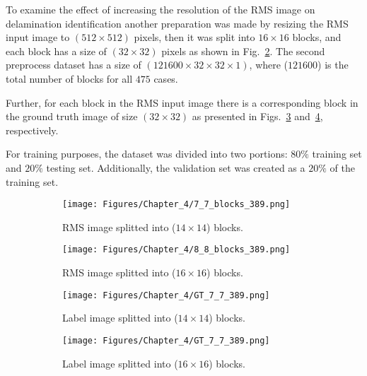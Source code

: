 To examine the effect of increasing the resolution of the RMS image on delamination identification another  preparation was made by resizing the RMS input image to \((512\times 512)\) pixels, then it was split into \(16\times 16\) blocks, and each block has a size of \((32\times 32)\) pixels as shown in Fig.~\ref{fig:RMS_64blocks}.
The second preprocess dataset has a size of \((121600 \times 32 \times 32 \times 1)\), where (\(121600\)) is the total number of blocks for all \(475\) cases.

Further, for each block in the RMS input image there is a corresponding block in the ground truth image of size \((32\times 32)\) as presented in Figs.~\ref{fig:GT_49blocks} and~\ref{fig:GT_64blocks}, respectively.

For training purposes, the dataset was divided into two portions: \(80\%\)	training set and \(20\%\) testing set. 
Additionally, the validation set was created as a \(20\%\) of the training set.
\begin{figure} [h!]
	\centering
	\begin{subfigure}[b]{0.47\textwidth}
		\centering
		\texttt{[image: Figures/Chapter\_4/7\_7\_blocks\_389.png]}
		\caption{RMS image splitted into (\(14\times 14\)) blocks.}
		\label{fig:RMS_49blocks}
	\end{subfigure}
	\hfill
	\begin{subfigure}[b]{0.47\textwidth}
		\centering
		\texttt{[image: Figures/Chapter\_4/8\_8\_blocks\_389.png]}
		\caption{RMS image splitted into (\(16\times 16\)) blocks.}
		\label{fig:RMS_64blocks}
	\end{subfigure}
	\hfill
	\begin{subfigure}[b]{0.47\textwidth}
		\centering
		\texttt{[image: Figures/Chapter\_4/GT\_7\_7\_389.png]}
		\caption{Label image splitted into (\(14\times 14\)) blocks.}
		\label{fig:GT_49blocks}
	\end{subfigure}
	\hfill
	\begin{subfigure}[b]{0.47\textwidth}
		\centering
		\texttt{[image: Figures/Chapter\_4/GT\_7\_7\_389.png]}
		\caption{Label image splitted into (\(16\times 16\)) blocks.}
		\label{fig:GT_64blocks}
	\end{subfigure}
	\caption{}
	\label{fig:grid_mesh}
\end{figure}

